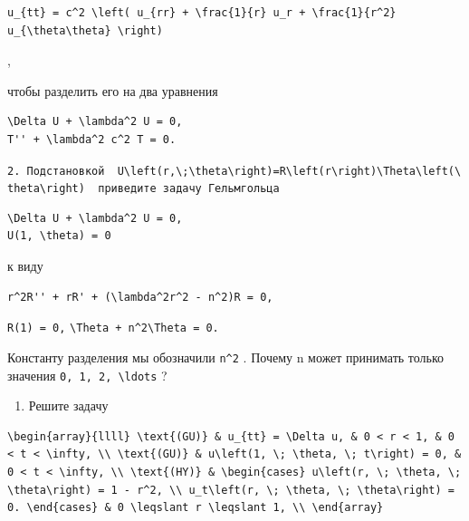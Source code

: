 \documentclass[
  ukrainian,
]{article}
\providecommand{\tightlist}{%
  \setlength{\itemsep}{0pt}\setlength{\parskip}{0pt}}
\begin{document}
\begin{verbatim}
u_{tt} = c^2 \left( u_{rr} + \frac{1}{r} u_r + \frac{1}{r^2} u_{\theta\theta} \right)
\end{verbatim}

,

чтобы разделить его на два уравнения

\begin{verbatim}
\Delta U + \lambda^2 U = 0,
T'' + \lambda^2 c^2 T = 0.
\end{verbatim}

\texttt{2.\ Подстановкой\ \ \textquotesingle{}U\textbackslash{}left(r,\textbackslash{};\textbackslash{}theta\textbackslash{}right)=R\textbackslash{}left(r\textbackslash{}right)\textbackslash{}Theta\textbackslash{}left(\textbackslash{}theta\textbackslash{}right)\textquotesingle{}\ \ приведите\ задачу\ Гельмгольца}

\begin{verbatim}
\Delta U + \lambda^2 U = 0,
U(1, \theta) = 0
\end{verbatim}

к виду

\begin{verbatim}
r^2R'' + rR' + (\lambda^2r^2 - n^2)R = 0,
\end{verbatim}

\texttt{R(1)\ =\ 0,}
\texttt{\textbackslash{}Theta\textquotesingle{}\textquotesingle{}\ +\ n\^{}2\textbackslash{}Theta\ =\ 0.}

Константу разделения мы обозначили \texttt{n\^{}2} . Почему n может
принимать только значения \texttt{0,\ 1,\ 2,\ \textbackslash{}ldots} ?

\begin{enumerate}
\def\labelenumi{\arabic{enumi}.}
\setcounter{enumi}{2}
\tightlist
\item
  Решите задачу
\end{enumerate}

\begin{verbatim}
\begin{array}{llll} \text{(GU)} & u_{tt} = \Delta u, & 0 < r < 1, & 0 < t < \infty, \\ \text{(GU)} & u\left(1, \; \theta, \; t\right) = 0, & 0 < t < \infty, \\ \text{(HY)} & \begin{cases} u\left(r, \; \theta, \; \theta\right) = 1 - r^2, \\ u_t\left(r, \; \theta, \; \theta\right) = 0. \end{cases} & 0 \leqslant r \leqslant 1, \\ \end{array}
\end{verbatim}
\end{document}
